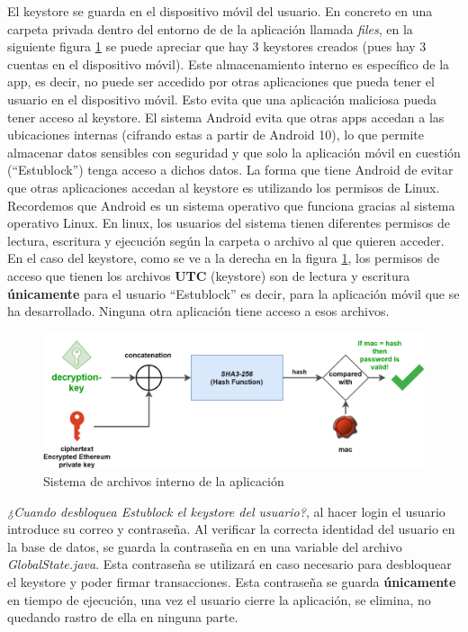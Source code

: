 El keystore se guarda en el dispositivo móvil del usuario. En concreto en una carpeta privada dentro del entorno de de la aplicación llamada \emph{files}, en la siguiente figura \ref{fig:fileSystem} se puede apreciar que hay 3 keystores creados (pues hay 3 cuentas en el dispositivo móvil). Este almacenamiento interno es específico de la app, es decir, no puede ser accedido por otras aplicaciones que pueda tener el usuario en el dispositivo móvil. Esto evita que una aplicación maliciosa pueda tener acceso al keystore. El sistema Android evita que otras apps accedan a las ubicaciones internas (cifrando estas a partir de Android 10), lo que permite almacenar datos sensibles con seguridad y que solo la aplicación móvil en cuestión (``Estublock'') tenga acceso a dichos datos. La forma que tiene Android de evitar que otras aplicaciones accedan al keystore es utilizando los permisos de Linux. Recordemos que Android es un sistema operativo que funciona gracias al sistema operativo Linux. En linux, los usuarios del sistema tienen diferentes permisos de lectura, escritura y ejecución según la carpeta o archivo al que quieren acceder. En el caso del keystore, como se ve a la derecha en la figura \ref{fig:fileSystem}, los permisos de acceso que tienen los archivos \textbf{UTC} (keystore) son de lectura y escritura \textbf{únicamente} para el usuario ``Estublock'' es decir, para la aplicación móvil que se ha desarrollado. Ninguna otra aplicación tiene acceso a esos archivos. \\

\begin{figure}[h!]
  \centering
  \includegraphics[width=1\linewidth]{figs/Desarrollo/Keystore/keystore_MAC}
  \caption[Sistema de archivos interno de la aplicación]{Sistema de archivos interno de la aplicación}
  \label{fig:fileSystem}
\end{figure}

\emph{¿Cuando desbloquea Estublock el keystore del usuario?}, al hacer login el usuario introduce su correo y contraseña. Al verificar la correcta identidad del usuario en la base de datos, se guarda la contraseña en en una variable del archivo \emph{GlobalState.java}. Esta contraseña se utilizará en caso necesario para desbloquear el keystore y poder firmar transacciones. Esta contraseña se guarda \textbf{únicamente} en tiempo de ejecución, una vez el usuario cierre la aplicación, se elimina, no quedando rastro de ella en ninguna parte. \\


